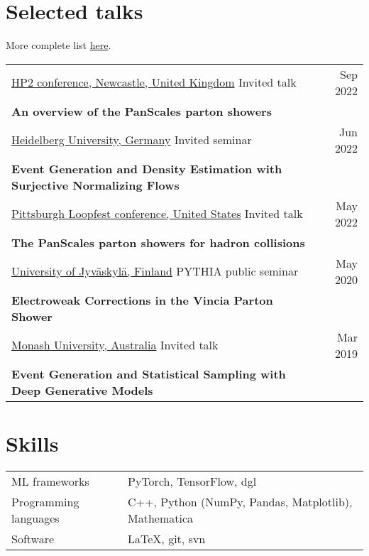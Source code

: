\documentclass[a4paper,12pt]{article}
\begin{document}
\section{Selected talks}
More complete list \href{https://rbvh.github.io/}{here}.

\begin{tabularx}{\linewidth}{ @{}l r@{} }
\underline{HP2 conference, Newcastle, United Kingdom} Invited talk & \hfil  Sep 2022 \\[1.75pt]
\textbf{An overview of the PanScales parton showers} & \\[3.5pt]

\underline{Heidelberg University, Germany} Invited seminar & \hfill Jun 2022 \\[1.75pt]
\textbf{Event Generation and Density Estimation with Surjective Normalizing Flows} & \\[3.5pt]

\underline{Pittsburgh Loopfest conference, United States} Invited talk & \hfill May 2022 \\[1.75pt]
\textbf{The PanScales parton showers for hadron collisions} & \\[3.5pt]

\underline{University of Jyväskylä, Finland} PYTHIA public seminar & \hfill May 2020 \\[1.75pt]
\textbf{Electroweak Corrections in the Vincia Parton Shower} & \\[3.5pt]

\underline{Monash University, Australia} Invited talk & \hfill Mar 2019 \\[1.75pt]
\textbf{Event Generation and Statistical Sampling with Deep Generative Models} &
\end{tabularx}





\section{Skills}
\begin{tabularx}{\linewidth}{@{}l X@{}}
ML frameworks & \normalsize{PyTorch, TensorFlow, dgl} \\
Programming languages & \normalsize{C++, Python (NumPy, Pandas, Matplotlib), Mathematica} \\
Software & \normalsize{LaTeX, git, svn}  \\
\end{tabularx}

\vfill
{}
\end{document}
